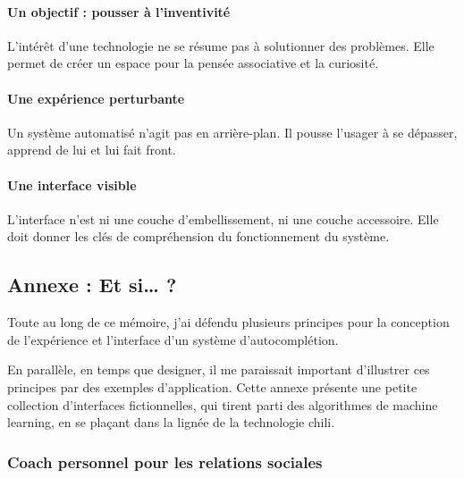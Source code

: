 \documentclass[]{article}
\let\oldparagraph\paragraph
\renewcommand{\paragraph}[1]{\oldparagraph{#1}\mbox{}}
\begin{document}
\hypertarget{un-objectif-pousser-uxe0-linventivituxe9}{%
\paragraph{Un objectif : pousser à
l'inventivité}\label{un-objectif-pousser-uxe0-linventivituxe9}}

L'intérêt d'une technologie ne se résume pas à solutionner des
problèmes. Elle permet de créer un espace pour la pensée associative et
la curiosité.

\hypertarget{une-expuxe9rience-perturbante}{%
\paragraph{Une expérience
perturbante}\label{une-expuxe9rience-perturbante}}

Un système automatisé n'agit pas en arrière-plan. Il pousse l'usager à
se dépasser, apprend de lui et lui fait front.

\hypertarget{une-interface-visible}{%
\paragraph{Une interface visible}\label{une-interface-visible}}

L'interface n'est ni une couche d'embellissement, ni une couche
accessoire. Elle doit donner les clés de compréhension du fonctionnement
du système.

\newpage

\newpage

\newpage

\hypertarget{annexe-et-si}{%
\subsection{Annexe : Et si\ldots{} ?}\label{annexe-et-si}}

Toute au long de ce mémoire, j'ai défendu plusieurs principes pour la
conception de l'expérience et l'interface d'un système d'autocomplétion.

En parallèle, en temps que designer, il me paraissait important
d'illustrer ces principes par des exemples d'application. Cette annexe
présente une petite collection d'interfaces fictionnelles, qui tirent
parti des algorithmes de machine learning, en se plaçant dans la lignée
de la technologie chili.

\newpage

\hypertarget{coach-personnel-pour-les-relations-sociales}{%
\subsubsection{Coach personnel pour les relations
sociales}\label{coach-personnel-pour-les-relations-sociales}}
\end{document}
